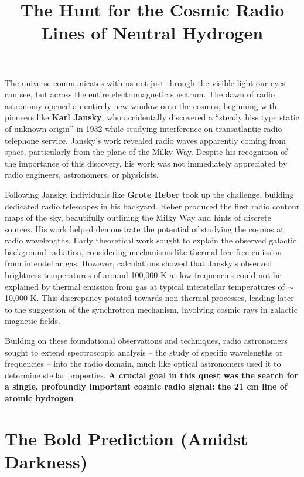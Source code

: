 \documentclass{../template/texnote}
\title{\textbf{The Hunt for the Cosmic Radio Lines of Neutral Hydrogen}}[author={Linn Abraham}]
\begin{document}
    \maketitle {}

The universe communicates with us not just through the visible light our eyes can see, but across the entire electromagnetic spectrum.
The dawn of radio astronomy opened an entirely new window onto the cosmos, beginning with pioneers like \textbf{Karl Jansky}, who accidentally discovered a ``steady hiss type static of unknown origin'' in 1932 while studying interference on transatlantic radio telephone service.
Jansky's work revealed radio waves apparently coming from space, particularly from the plane of the Milky Way.
Despite his recognition of the importance of this discovery, his work was not immediately appreciated by radio engineers, astronomers, or physicists.

Following Jansky, individuals like \textbf{Grote Reber} took up the challenge, building dedicated radio telescopes in his backyard.
Reber produced the first radio contour maps of the sky, beautifully outlining the Milky Way and hints of discrete sources.
His work helped demonstrate the potential of studying the cosmos at radio wavelengths.
Early theoretical work sought to explain the observed galactic background radiation, considering mechanisms like thermal free-free emission from interstellar gas.
However, calculations showed that Jansky's observed brightness temperatures of around 100,000 K at low frequencies could not be explained by thermal emission from gas at typical interstellar temperatures of $\sim$10,000 K.
This discrepancy pointed towards non-thermal processes, leading later to the suggestion of the synchrotron mechanism, involving cosmic rays in galactic magnetic fields.

Building on these foundational observations and techniques, radio astronomers sought to extend spectroscopic analysis -- the study of specific wavelengths or frequencies -- into the radio domain, much like optical astronomers used it to determine stellar properties.
\textbf{A crucial goal in this quest was the search for a single, profoundly important cosmic radio signal: the 21 cm line of atomic hydrogen}

\section{The Bold Prediction (Amidst Darkness)}
\end{document}
